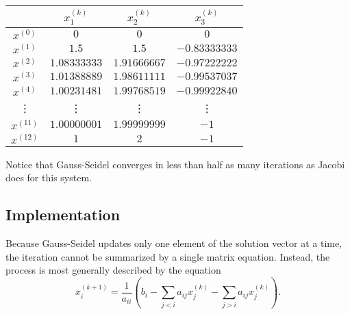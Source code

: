 \begin{center}
\begin{tabular}{c|ccc}
    & $x^{(k)}_1$ & $x^{(k)}_2$ & $x^{(k)}_3$ \\
    \hline
      $x^{(0)}$ & $0$ & $0$ & $0$ \\
      $x^{(1)}$ & $1.5$ & $1.5$ & $-0.83333333$ \\
      $x^{(2)}$ & $1.08333333$ & $1.91666667$ & $-0.97222222$ \\
      $x^{(3)}$ & $1.01388889$ & $1.98611111$ & $-0.99537037$ \\
      $x^{(4)}$ & $1.00231481$ & $1.99768519$ & $-0.99922840$ \\
      \vdots    & \vdots       & \vdots       & \vdots     \\
      $x^{(11)}$ & $1.00000001$ & $1.99999999$ & $-1$ \\
      $x^{(12)}$ & $1$ & $2$ & $-1$ \\
\end{tabular}
\end{center}
Notice that Gauss-Seidel converges in less than half as many iterations as Jacobi does for this system.

\subsection*{Implementation} %


Because Gauss-Seidel updates only one element of the solution vector at a time, the iteration cannot be summarized by a single matrix equation.
Instead, the process is most generally described by the equation
\begin{equation}
\label{eq:gauss-seidel-full}
x^{(k+1)}_i = \frac{1}{a_{ii}} \left(b_i - \sum_{j < i}a_{ij}x^{(k)}_j - \sum_{j > i}a_{ij}x^{(k)}_j \right).
\end{equation}

